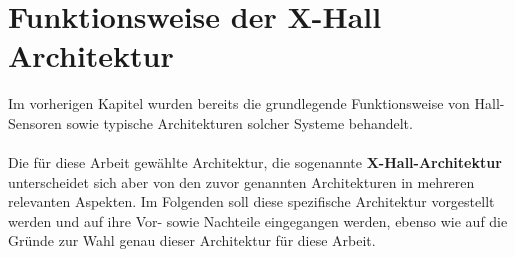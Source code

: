 \documentclass[12pt, a4paper]{article}
\begin{document}
	\section{Funktionsweise der X-Hall Architektur}
		Im vorherigen Kapitel wurden bereits die grundlegende Funktionsweise von Hall-Sensoren sowie typische Architekturen solcher Systeme behandelt.\paragraph{}
		Die für diese Arbeit gewählte Architektur, die sogenannte \textbf{X-Hall-Architektur} unterscheidet sich aber von den zuvor genannten Architekturen in mehreren relevanten Aspekten. Im Folgenden soll diese spezifische Architektur vorgestellt werden und auf ihre Vor- sowie Nachteile eingegangen werden, ebenso wie auf die Gründe zur Wahl genau dieser %
		Architektur für diese Arbeit.
		
\end{document}
